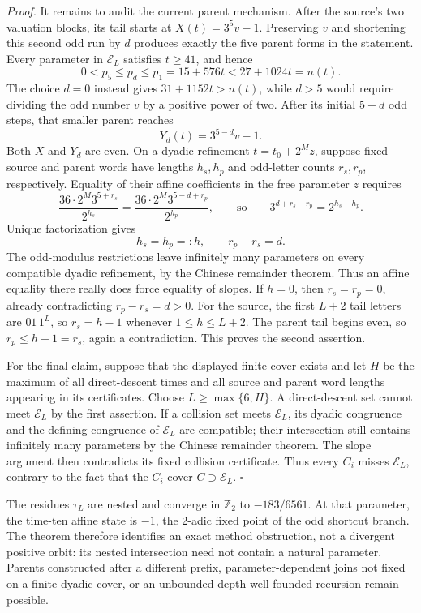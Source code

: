 \documentclass[11pt,letterpaper]{article}
\newenvironment{proof}{\noindent\textit{Proof.}}{\hfill\(\square\)}
\begin{document}
\begin{proof}
It remains to audit the current parent mechanism. After the source's two valuation blocks, its tail starts at
\(X(t)=3^5v-1\).
Preserving \(v\) and shortening this second odd run by \(d\) produces
exactly the five parent forms in the statement. Every parameter in
\(\mathcal E_L\) satisfies \(t\ge41\), and hence
\[
0<p_5\le p_d\le p_1=15+576t<27+1024t=n(t).
\]
The choice \(d=0\) instead gives \(31+1152t>n(t)\), while \(d>5\)
would require dividing the odd number \(v\) by a positive power of two.
After its initial \(5-d\) odd steps, that smaller parent reaches
\[
Y_d(t)=3^{5-d}v-1.
\]
Both \(X\) and \(Y_d\) are even. On a dyadic refinement
\(t=t_0+2^Mz\), suppose fixed source and parent words have lengths
\(h_s,h_p\) and odd-letter counts \(r_s,r_p\), respectively. Equality
of their affine coefficients in the free parameter \(z\) requires
\[
\frac{36\cdot2^M3^{5+r_s}}{2^{h_s}}
 =\frac{36\cdot2^M3^{5-d+r_p}}{2^{h_p}},
\qquad\text{so}\qquad
3^{d+r_s-r_p}=2^{h_s-h_p}.
\]
Unique factorization gives
\[
h_s=h_p=:h,
\qquad r_p-r_s=d.
\]
The odd-modulus restrictions leave infinitely many parameters on every
compatible dyadic refinement, by the Chinese remainder theorem. Thus an
affine equality there really does force equality of slopes.
If \(h=0\), then \(r_s=r_p=0\), already contradicting
\(r_p-r_s=d>0\). For the source, the first \(L+2\) tail letters are
\(01\,1^L\), so \(r_s=h-1\) whenever \(1\le h\le L+2\). The parent
tail begins even, so \(r_p\le h-1=r_s\), again a contradiction. This
proves the second assertion.

For the final claim, suppose that the displayed finite cover exists and let
\(H\) be the maximum of all direct-descent times and all source and
parent word lengths appearing in its certificates. Choose
\(L\ge\max\{6,H\}\). A direct-descent set cannot meet
\(\mathcal E_L\) by the first assertion. If a collision set meets
\(\mathcal E_L\), its dyadic congruence and the defining congruence of
\(\mathcal E_L\) are compatible; their intersection still contains
infinitely many parameters by the Chinese remainder theorem. The slope
argument then contradicts its fixed collision certificate. Thus every
\(C_i\) misses \(\mathcal E_L\), contrary to the fact that the \(C_i\)
cover \(C\supset\mathcal E_L\).
\end{proof}

The residues \(\tau_L\) are nested and converge in \(\mathbb Z_2\) to
\(-183/6561\). At that parameter, the time-ten affine state is \(-1\),
the 2-adic fixed point of the odd shortcut branch. The theorem therefore
identifies an exact method obstruction, not a divergent positive orbit:
its nested intersection need not contain a natural parameter. Parents
constructed after a different prefix, parameter-dependent joins not fixed
on a finite dyadic cover, or an unbounded-depth well-founded recursion
remain possible.
\end{document}
